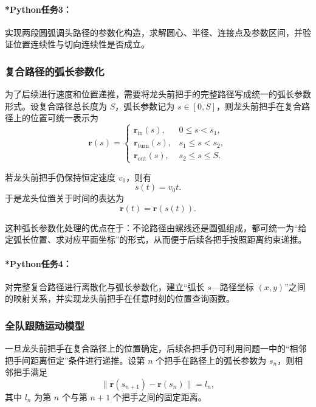 \documentclass[12pt,a4paper]{ctexart}
\begin{document}
\paragraph{*Python任务3：}
实现两段圆弧调头路径的参数化构造，求解圆心、半径、连接点及参数区间，并验证位置连续性与切向连续性是否成立。

\subsubsection{复合路径的弧长参数化}
为了后续进行速度和位置递推，需要将龙头前把手的完整路径写成统一的弧长参数形式。设复合路径总长度为 $S$，弧长参数记为 $s\in[0,S]$，则龙头前把手在复合路径上的位置可统一表示为
\begin{equation}
\bm{r}(s)=
\begin{cases}
\bm{r}_{\mathrm{in}}(s), & 0\le s<s_1,\\
\bm{r}_{\mathrm{turn}}(s), & s_1\le s<s_2,\\
\bm{r}_{\mathrm{out}}(s), & s_2\le s\le S.
\end{cases}
\end{equation}

若龙头前把手仍保持恒定速度 $v_0$，则有
\begin{equation}
s(t)=v_0 t.
\end{equation}
于是龙头位置关于时间的表达为
\begin{equation}
\bm{r}(t)=\bm{r}(s(t)).
\end{equation}

这种弧长参数化处理的优点在于：不论路径由螺线还是圆弧组成，都可统一为“给定弧长位置、求对应平面坐标”的形式，从而便于后续各把手按照距离约束递推。

\paragraph{*Python任务4：}
对完整复合路径进行离散化与弧长参数化，建立“弧长 $s$—路径坐标 $(x,y)$”之间的映射关系，并实现龙头前把手在任意时刻的位置查询函数。

\subsubsection{全队跟随运动模型}
一旦龙头前把手在复合路径上的位置确定，后续各把手仍可利用问题一中的“相邻把手间距离恒定”条件进行递推。设第 $n$ 个把手在路径上的弧长参数为 $s_n$，则相邻把手满足
\begin{equation}
\|\bm{r}(s_{n+1})-\bm{r}(s_n)\|=l_n,
\end{equation}
其中 $l_n$ 为第 $n$ 个与第 $n+1$ 个把手之间的固定距离。
\end{document}
